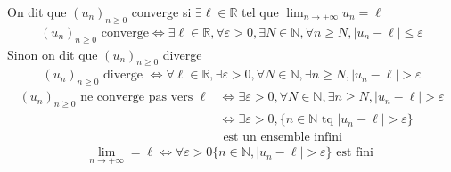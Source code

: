 \begin{graybox}
    \begin{definition}[]
    On dit que $(u_n)_{n \geqslant 0}$ converge si $\exists \ell \in \mathbb{R}$ tel que $\displaystyle{\lim_{n \to +\infty} u_n = \ell}$
    \begin{align*}
        (u_n)_{n \geqslant 0} \text{ converge} \iff \exists \ell \in \mathbb{R}, \forall \varepsilon > 0, \exists N \in \mathbb{N}, \forall n \geqslant N, \left|u_n - \ell\right| \leqslant \varepsilon
    \end{align*}
    Sinon on dit que $(u_n)_{n \geqslant 0}$ diverge
    \begin{align*}
        (u_n)_{n \geqslant 0} \text{ diverge } \iff \forall \ell \in \mathbb{R}, \exists \varepsilon > 0, \forall N \in \mathbb{N}, \exists n \geqslant N, \left|u_n - \ell \right| > \varepsilon
    \end{align*}
    \begin{align*}
        (u_n)_{n \geqslant 0} \text{ ne converge pas vers  }\ell &\iff \exists \varepsilon > 0, \forall N \in \mathbb{N}, \exists n \geqslant N, |u_n - \ell| > \varepsilon \\
        &\iff \exists \varepsilon > 0, \{n \in \mathbb{N} \text{ tq } |u_n - \ell| > \varepsilon\} \\ &\text{ est un ensemble infini}
    \end{align*}
    \begin{align*}
        \lim_{n \to +\infty} = \ell \iff \forall \varepsilon > 0 \{n \in \mathbb{N}, |u_n - \ell| > \varepsilon\} \text{ est fini }
    \end{align*}
\end{definition}
\end{graybox}

